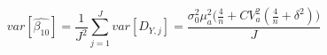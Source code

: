 \begin{equation}
\label{avgvar}
var[\hat{\beta_{10}}] = \frac{1}{J^2}\sum\limits_{j=1}^{J}{var[D_{Y,j}]} = \frac{\sigma_0^2\mu_a^2\Big(\frac{4}{n} + CV_{a}^2(\frac{4}{n} + \delta^2)\Big)}{J}
\end{equation}